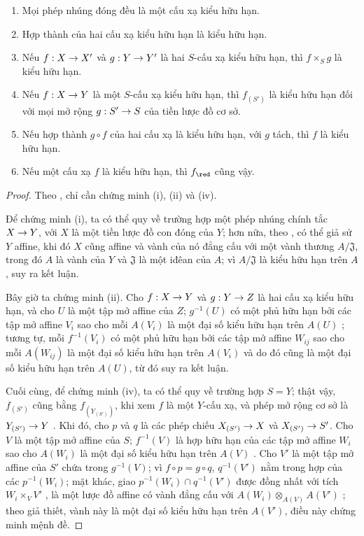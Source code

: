 \documentclass[oneside]{amsart}
\makeatletter
\newcommand{\ega@arrow}[2]{\mathchoice{#1}{#2}{#2}{#2}}
\renewcommand{\to}{\ega@arrow{\longrightarrow}{\rightarrow}}
\newcommand{\oldpage}[2][]{{\marginnote{\normalfont\textbf{#1}~|~#2}}\ignorespaces}
\let\EGAOriginalLabel\label
\renewcommand{\label}[1]{\phantomsection\EGAOriginalLabel{#1}}
\makeatother
\begin{document}
\begin{proposition}[6.3.4]
\label{I.6.3.4}
\medskip\noindent
\begin{enumerate}
  \item[{\rm(i)}] Mọi phép nhúng đóng đều là một cấu xạ kiểu hữu hạn.
  \item[{\rm(ii)}] Hợp thành của hai cấu xạ kiểu hữu hạn là kiểu hữu hạn.
  \item[{\rm(iii)}] Nếu $f:X\to X'$ và $g:Y\to Y'$ là hai $S$-cấu xạ kiểu hữu hạn, thì $f\times_S g$ là kiểu hữu hạn.
  \item[{\rm(iv)}] Nếu $f:X\to Y$ là một $S$-cấu xạ kiểu hữu hạn, thì $f_{(S')}$ là kiểu hữu hạn đối với mọi mở rộng $g:S'\to S$ của tiền lược đồ cơ sở.
  \item[{\rm(v)}] Nếu hợp thành $g\circ f$ của hai cấu xạ là kiểu hữu hạn, với $g$ tách, thì $f$ là kiểu hữu hạn.
  \item[{\rm(vi)}] Nếu một cấu xạ $f$ là kiểu hữu hạn, thì $f_\red$ cũng vậy.
\end{enumerate}
\end{proposition}

\begin{proof}
Theo , chỉ cần chứng minh (i), (ii) và (iv).

Để chứng minh (i), ta có thể quy về trường hợp một phép nhúng chính tắc
$X\to Y$, với $X$ là một tiền lược đồ con đóng của $Y$; hơn nữa, theo
, có thể giả sử $Y$ affine, khi đó $X$ cũng affine
 và vành của nó đẳng cấu với một vành thương
$A/\mathfrak{J}$, trong đó $A$ là vành của $Y$ và $\mathfrak{J}$ là một
iđêan của $A$; vì $A/\mathfrak{J}$ là kiểu hữu hạn trên $A$, suy ra kết
luận.

Bây giờ ta chứng minh (ii). Cho $f:X\to Y$ và $g:Y\to Z$ là hai cấu xạ kiểu
hữu hạn, và cho $U$ là một tập mở affine của $Z$; $g^{-1}(U)$ có một phủ hữu
hạn bởi các tập mở affine $V_i$ sao cho mỗi $A(V_i)$ là một đại số kiểu hữu
hạn trên $A(U)$ ; tương tự,
\oldpage[I]{146}
mỗi $f^{-1}(V_i)$ có một phủ hữu hạn bởi các tập mở affine $W_{ij}$ sao cho
mỗi $A(W_{ij})$ là một đại số kiểu hữu hạn trên $A(V_i)$ và do đó cũng là
một đại số kiểu hữu hạn trên $A(U)$, từ đó suy ra kết luận.

Cuối cùng, để chứng minh (iv), ta có thể quy về trường hợp $S=Y$; thật vậy,
$f_{(S')}$ cũng bằng $f_{(Y_{(S')})}$, khi xem $f$ là một $Y$-cấu xạ, và
phép mở rộng cơ sở là $Y_{(S')}\to Y$ . Khi đó, cho $p$ và
$q$ là các phép chiếu $X_{(S')}\to X$ và $X_{(S')}\to S'$. Cho $V$ là một
tập mở affine của $S$; $f^{-1}(V)$ là hợp hữu hạn của các tập mở affine
$W_i$ sao cho $A(W_i)$ là một đại số kiểu hữu hạn trên $A(V)$
. Cho $V'$ là một tập mở affine của $S'$ chứa trong
$g^{-1}(V)$; vì $f\circ p=g\circ q$, $q^{-1}(V')$ nằm trong hợp của các
$p^{-1}(W_i)$; mặt khác, giao $p^{-1}(W_i)\cap q^{-1}(V')$ được đồng nhất
với tích $W_i\times_V V'$ , là một lược đồ affine có vành
đẳng cấu với $A(W_i)\otimes_{A(V)}A(V')$ ; theo giả thiết,
vành này là một đại số kiểu hữu hạn trên $A(V')$, điều này chứng minh mệnh
đề.
\end{proof}
\end{document}
